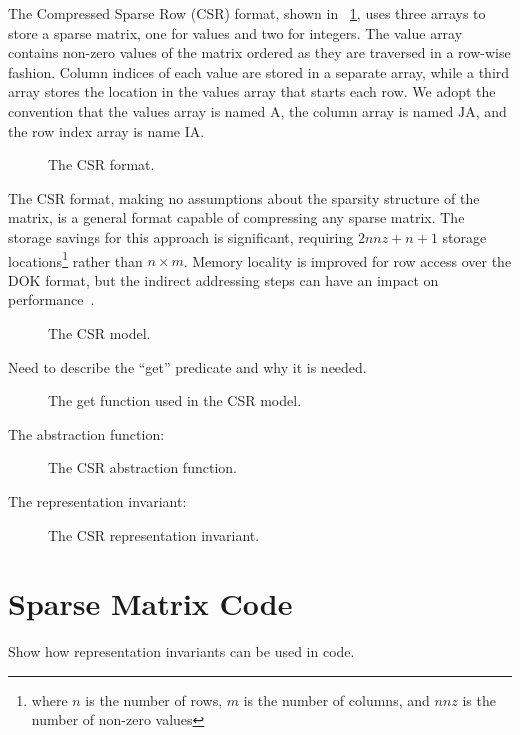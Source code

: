 \documentclass[11pt,conference]{IEEEtran}
\begin{document}
The Compressed Sparse Row (CSR) format, shown in \figurename~\ref{image:csr}, uses three arrays to store a sparse matrix, one for values and two for integers.  The value array contains non-zero values of the matrix ordered as they are traversed in a row-wise fashion.  Column indices of each value are stored in a separate array, while a third array stores the location in the values array that starts each row.  We adopt the convention that the values array is named $\mathrm{A}$, the column array is named $\mathrm{JA}$, and the row index array is name $\mathrm{IA}$.

\begin{figure}
\centering

\caption{The CSR format.}
\label{image:csr}
\end{figure}

The CSR format, making no assumptions about the sparsity structure of the matrix, is a general format capable of compressing any sparse matrix.  The storage savings for this approach is significant, requiring $2nnz+n+1$ storage locations\footnote{where $n$ is the number of rows, $m$ is the number of columns, and $nnz$ is the number of non-zero values} rather than $n \times m$.  Memory locality is improved for row access over the DOK format, but the indirect addressing steps can have an impact on performance~\cite{bai}.

\begin{figure}
\centering

\caption{The CSR model.}
\label{model:csr}
\end{figure}

Need to describe the ``get'' predicate and why it is needed.

\begin{figure}
\centering

\caption{The get function used in the CSR model.}
\label{get:csr}
\end{figure}

The abstraction function:

\begin{figure}
\centering

\caption{The CSR abstraction function.}
\label{alpha:csr}
\end{figure}

The representation invariant:

\begin{figure}
\centering

\caption{The CSR representation invariant.}
\label{repinv:csr}
\end{figure}

\section{Sparse Matrix Code}

Show how representation invariants can be used in code.



\end{document}
